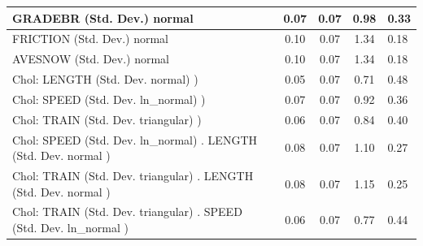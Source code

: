 \begin{table}
\begin{center}
\begin{tabular}{|l|l|c|c|c|l|}
			\hline
			GRADEBR (Std. Dev.) normal &  & 0.07 & 0.07 & 0.98 & 0.33 \\
			\hline
			FRICTION (Std. Dev.) normal &  & 0.10 & 0.07 & 1.34 & 0.18 \\
			\hline
			AVESNOW (Std. Dev.) normal &  & 0.10 & 0.07 & 1.34 & 0.18 \\
			\hline
			 Chol: LENGTH (Std. Dev. normal) ) &  & 0.05 & 0.07 & 0.71 & 0.48 \\
			\hline
			 Chol: SPEED (Std. Dev. ln_normal) ) &  & 0.07 & 0.07 & 0.92 & 0.36 \\
			\hline
			 Chol: TRAIN (Std. Dev. triangular) ) &  & 0.06 & 0.07 & 0.84 & 0.40 \\
			\hline
			 Chol: SPEED (Std. Dev. ln_normal) . LENGTH (Std. Dev.   normal ) &  & 0.08 & 0.07 & 1.10 & 0.27 \\
			\hline
			 Chol: TRAIN (Std. Dev. triangular) . LENGTH (Std. Dev.   normal ) &  & 0.08 & 0.07 & 1.15 & 0.25 \\
			\hline
			 Chol: TRAIN (Std. Dev. triangular) . SPEED (Std. Dev.   ln_normal ) &  & 0.06 & 0.07 & 0.77 & 0.44 \\
			\hline
		\end{tabular}
	\end{center}
\end{table}